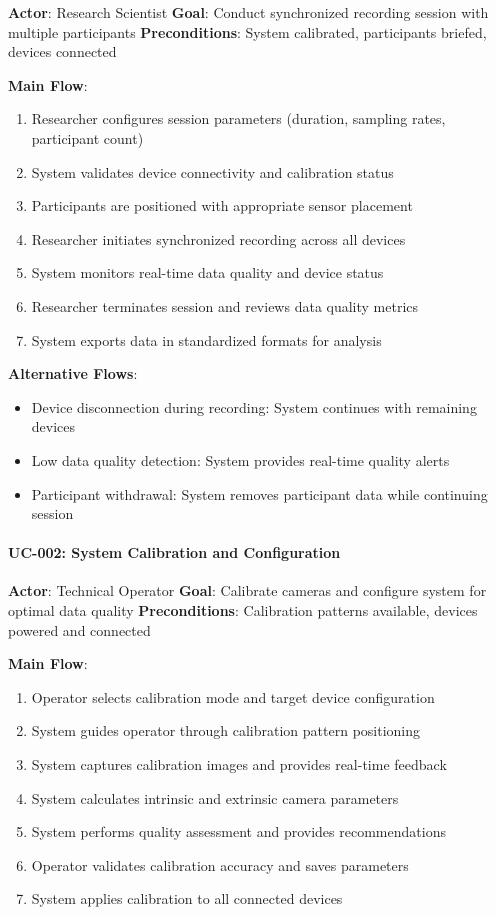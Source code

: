 \documentclass[11pt,a4paper]{report}
\begin{document}
\textbf{Actor}: Research Scientist
\textbf{Goal}: Conduct synchronized recording session with multiple participants
\textbf{Preconditions}: System calibrated, participants briefed, devices connected

\textbf{Main Flow}:

\begin{enumerate}
\item Researcher configures session parameters (duration, sampling rates, participant count)
\item System validates device connectivity and calibration status
\item Participants are positioned with appropriate sensor placement
\item Researcher initiates synchronized recording across all devices
\item System monitors real-time data quality and device status
\item Researcher terminates session and reviews data quality metrics
\item System exports data in standardized formats for analysis

\end{enumerate}
\textbf{Alternative Flows}:

\begin{itemize}
\item Device disconnection during recording: System continues with remaining devices
\item Low data quality detection: System provides real-time quality alerts
\item Participant withdrawal: System removes participant data while continuing session

\end{itemize}
\paragraph{UC-002: System Calibration and Configuration}

\textbf{Actor}: Technical Operator
\textbf{Goal}: Calibrate cameras and configure system for optimal data quality
\textbf{Preconditions}: Calibration patterns available, devices powered and connected

\textbf{Main Flow}:

\begin{enumerate}
\item Operator selects calibration mode and target device configuration
\item System guides operator through calibration pattern positioning
\item System captures calibration images and provides real-time feedback
\item System calculates intrinsic and extrinsic camera parameters
\item System performs quality assessment and provides recommendations
\item Operator validates calibration accuracy and saves parameters
\item System applies calibration to all connected devices

\end{enumerate}
\end{document}
